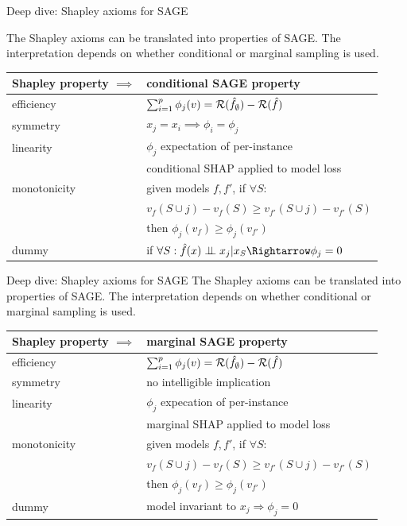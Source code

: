 \documentclass[10pt,compress,t,notes=noshow, xcolor=table]{beamer}
\begin{document}

\begin{frame}{Deep dive: Shapley axioms for SAGE}

The Shapley axioms can be translated into properties of SAGE. The interpretation depends on whether conditional or marginal sampling is used.
%
\begin{table}
  \centering
  \begin{tabular}{l | l }
  Shapley property $\implies$ & conditional SAGE property \\
  \hline
  efficiency & $\sum_{i=1}^p \phi_j(v) = \mathcal{R}(\hat{f}_\emptyset) - \mathcal{R}(\hat{f})$\\ %
  symmetry & $x_j = x_i \implies \phi_i = \phi_j$ \\ 
  linearity & $\phi_j$ expectation of per-instance\\
  & conditional SHAP applied to model loss\\ %
  monotonicity & given models $f, f'$, if  $\forall S:$\\
  &$v_f(S \cup j) - v_f(S) \geq v_{f'}(S \cup j) - v_{f'}(S)$ \\
  &then $\phi_j(v_f) \geq \phi_j(v_{f'})$\\ %
  dummy & if $\forall S: \fh(x) \indep x_j | x_S \Rightarrow \phi_j = 0$
  \end{tabular}
\end{table}

\end{frame}

\begin{frame}{Deep dive: Shapley axioms for SAGE}
%
The Shapley axioms can be translated into properties of SAGE. The interpretation depends on whether conditional or marginal sampling is used.
%
\begin{table}
  \centering
  \begin{tabular}{l | l }
  Shapley property $\implies$ & marginal SAGE property \\
  \hline
  efficiency & $\sum_{i=1}^p \phi_j(v) = \mathcal{R}(\hat{f}_\emptyset) - \mathcal{R}(\hat{f})$\\
  symmetry & no intelligible implication \\
  linearity & $\phi_j$ expecation of per-instance\\
  & marginal SHAP applied to model loss\\
  monotonicity & given models $f, f'$, if  $\forall S:$\\
  &$v_f(S \cup j) - v_f(S) \geq v_{f'}(S \cup j) - v_{f'}(S)$ \\
  &then $\phi_j(v_f) \geq \phi_j(v_{f'})$\\
  dummy & model invariant to $x_j \Rightarrow \phi_j = 0$\\
  \end{tabular}
\end{table}
%
\end{frame}

\endlecture
\end{document}
